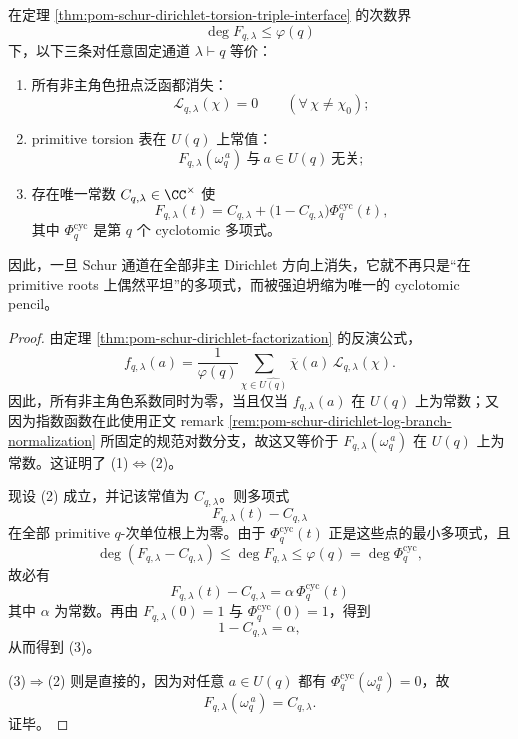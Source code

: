 \begin{theorem}\label{thm:derived-schur-dirichlet-torsion-flat-cyclotomic-pencil}
在定理 \ref{thm:pom-schur-dirichlet-torsion-triple-interface} 的次数界
\[
\deg F_{q,\lambda}\le \varphi(q)
\]
下，以下三条对任意固定通道 \(\lambda\vdash q\) 等价：
\begin{enumerate}
\normalfont
  \item 所有非主角色扭点泛函都消失：
  \[
  \mathcal L_{q,\lambda}(\chi)=0
  \qquad (\forall\,\chi\neq\chi_0);
  \]
  \item primitive torsion 表在 \(U(q)\) 上常值：
  \[
  F_{q,\lambda}(\omega_q^{\,a})\ \text{与}\ a\in U(q)\ \text{无关};
  \]
  \item 存在唯一常数 \(C_{q,\lambda}\in\CC^\times\) 使
  \[
  F_{q,\lambda}(t)
  =
  C_{q,\lambda}
  +
  \bigl(1-C_{q,\lambda}\bigr)\Phi_q^{\mathrm{cyc}}(t),
  \]
  其中 \(\Phi_q^{\mathrm{cyc}}\) 是第 \(q\) 个 cyclotomic 多项式。
\end{enumerate}
因此，一旦 Schur 通道在全部非主 Dirichlet 方向上消失，它就不再只是“在 primitive roots 上偶然平坦”的多项式，而被强迫坍缩为唯一的 cyclotomic pencil。
\end{theorem}

\begin{proof}
由定理 \ref{thm:pom-schur-dirichlet-factorization} 的反演公式，
\[
f_{q,\lambda}(a)
=
\frac{1}{\varphi(q)}
\sum_{\chi\in\widehat{U(q)}}\overline{\chi}(a)\,\mathcal L_{q,\lambda}(\chi).
\]
因此，所有非主角色系数同时为零，当且仅当 \(f_{q,\lambda}(a)\) 在 \(U(q)\) 上为常数；又因为指数函数在此使用正文 remark \ref{rem:pom-schur-dirichlet-log-branch-normalization} 所固定的规范对数分支，故这又等价于 \(F_{q,\lambda}(\omega_q^{\,a})\) 在 \(U(q)\) 上为常数。这证明了 (1)\(\Leftrightarrow\)(2)。

现设 (2) 成立，并记该常值为 \(C_{q,\lambda}\)。则多项式
\[
F_{q,\lambda}(t)-C_{q,\lambda}
\]
在全部 primitive \(q\)-次单位根上为零。由于 \(\Phi_q^{\mathrm{cyc}}(t)\) 正是这些点的最小多项式，且
\[
\deg(F_{q,\lambda}-C_{q,\lambda})\le \deg F_{q,\lambda}\le \varphi(q)=\deg \Phi_q^{\mathrm{cyc}},
\]
故必有
\[
F_{q,\lambda}(t)-C_{q,\lambda}=\alpha\,\Phi_q^{\mathrm{cyc}}(t)
\]
其中 \(\alpha\) 为常数。再由 \(F_{q,\lambda}(0)=1\) 与 \(\Phi_q^{\mathrm{cyc}}(0)=1\)，得到
\[
1-C_{q,\lambda}=\alpha,
\]
从而得到 (3)。

(3)\(\Rightarrow\)(2) 则是直接的，因为对任意 \(a\in U(q)\) 都有 \(\Phi_q^{\mathrm{cyc}}(\omega_q^{\,a})=0\)，故
\[
F_{q,\lambda}(\omega_q^{\,a})=C_{q,\lambda}.
\]
证毕。
\end{proof}

